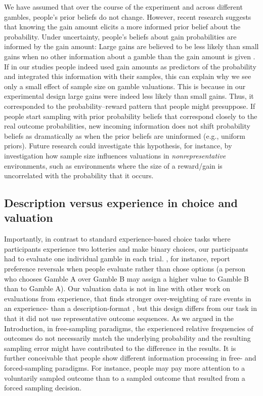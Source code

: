 \documentclass[a4paper, man, natbib, floatsintext]{apa6} %
\begin{document}
We have assumed that over the course of the experiment and across different gambles, people's prior beliefs do not change. However, recent research suggests that knowing the gain amount elicits a more informed prior belief about the probability. Under uncertainty, people's beliefs about gain probabilities are informed by the gain amount: Large gains are believed to be less likely than small gains when no other information about a gamble than the gain amount is given \citep{Pleskac2014, Hoffart2018}. If in our studies people indeed used gain amounts as predictors of the probability and integrated this information with their samples, this can explain why we see only a small effect of sample size on gamble valuations. This is because in our experimental design large gains were indeed less likely than small gains. Thus, it corresponded to the probability--reward pattern that people might presuppose. If people start sampling with prior probability beliefs that correspond closely to the real outcome probabilities, new incoming information does not shift probability beliefs as dramatically as when the prior beliefs are uninformed (e.g., uniform priors). Future research could investigate this hypothesis, for instance, by investigation how sample size influences valuations in \textit{nonrepresentative} environments, such as environments where the size of a reward/gain is uncorrelated with the probability that it occurs.

\subsection{Description versus experience in choice and valuation}

Importantly, in contrast to standard experience-based choice tasks where participants experience two lotteries and make binary choices, our participants had to evaluate one individual gamble in each trial. \cite{Lichtenstein1971}, for instance, report preference reversals when people evaluate rather than chose options (a person who chooses Gamble A over Gamble B may assign a higher value to Gamble B than to Gamble A). Our valuation data is not in line with other work on evaluations from experience, that finds stronger over-weighting of rare events in an experience- than a description-format \citep{Golan2014}, but this design differs from our task in that it did not use representative outcome sequences. As we argued in the Introduction, in free-sampling paradigms, the experienced relative frequencies of outcomes do not necessarily match the underlying probability and the resulting sampling error might have contributed to the difference in the results. It is further conceivable that people show different information processing in free- and forced-sampling paradigms. For instance, people may pay more attention to a voluntarily sampled outcome than to a sampled outcome that resulted from a forced sampling decision.
\end{document}
